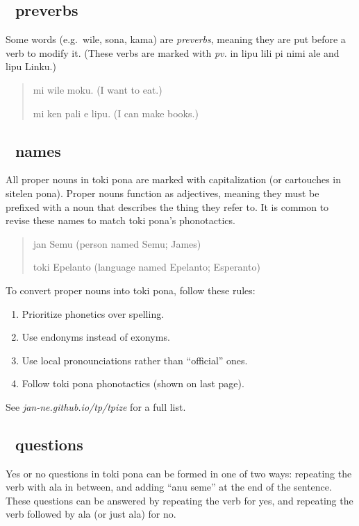 \documentclass[statementpaper,oneside,article,14pt]{memoir}
\begin{document}
\subsection{{\sitpon󱥷} preverbs}

\noindent Some words (e.g.\ wile, sona, kama) are \textit{preverbs}, meaning they are put before a verb
to modify it. (These verbs are marked with \textit{pv.} in lipu lili pi nimi ale and lipu Linku.)

\begin{quote}
  mi wile moku. (I want to eat.)

  mi ken pali e lipu. (I can make books.)
\end{quote}

\subsection{{\sitpon󱤑} names}

\noindent All proper nouns in toki pona are marked with capitalization (or cartouches in sitelen pona).
Proper nouns function as adjectives, meaning they must be prefixed with a noun that describes 
the thing they refer to. It is common to revise these names to match toki pona's phonotactics.

\begin{quote}
  jan Semu (person named Semu; James)

  toki Epelanto (language named Epelanto; Esperanto)
\end{quote}

To convert proper nouns into toki pona, follow these rules:

\begin{enumerate}[itemsep=-5pt]
\item Prioritize phonetics over spelling.
\item Use endonyms instead of exonyms.
\item Use local pronounciations rather than ``official'' ones.
\item Follow toki pona phonotactics (shown on last page).
\end{enumerate}

\noindent See \textit{jan-ne.github.io/tp/tpize} for a full list.

\subsection{{\sitpon󱥙} questions}

\noindent Yes or no questions in toki pona can be formed in one of two ways: repeating the verb with ala in 
between, and adding ``anu seme'' at the end of the sentence. These questions can be answered 
by repeating the verb for yes, and repeating the verb followed by ala (or just ala) for no.
\end{document}

